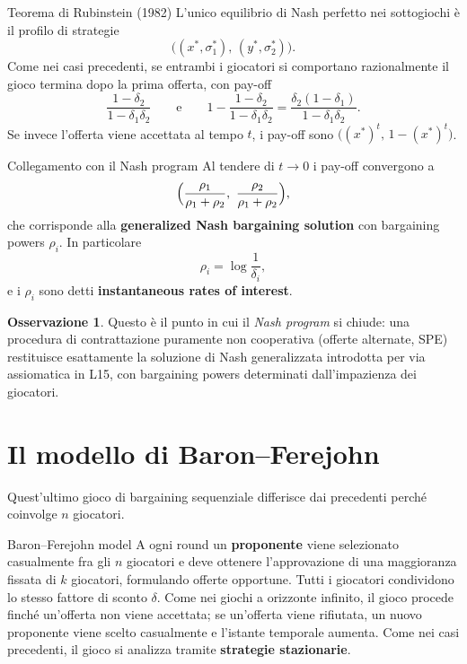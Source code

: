 \documentclass[12pt,a4paper,twoside]{book}
\theoremstyle{plain}
\theoremstyle{definition}
\newtheorem{remark}[theorem]{Osservazione}
\begin{document}
\begin{thmbox}{Teorema di Rubinstein (1982)}
L'unico equilibrio di Nash perfetto nei sottogiochi è il profilo di strategie
\[
  \bigl((x^*,\sigma_1^*),\,(y^*,\sigma_2^*)\bigr).
\]
Come nei casi precedenti, se entrambi i giocatori si comportano razionalmente il gioco
termina dopo la prima offerta, con pay-off
\[
  \frac{1-\delta_2}{1-\delta_1\delta_2}
  \qquad\text{e}\qquad
  1-\frac{1-\delta_2}{1-\delta_1\delta_2}=\frac{\delta_2(1-\delta_1)}{1-\delta_1\delta_2}.
\]
Se invece l'offerta viene accettata al tempo $t$, i pay-off sono
$\bigl((x^*)^t,\,1-(x^*)^t\bigr)$.
\end{thmbox}

\begin{thmbox}{Collegamento con il Nash program}
Al tendere di $t\to0$ i pay-off convergono a
\[
  \Bigl(\frac{\rho_1}{\rho_1+\rho_2},\ \frac{\rho_2}{\rho_1+\rho_2}\Bigr),
\]
che corrisponde alla \textbf{generalized Nash bargaining solution} con bargaining powers
$\rho_i$. In particolare
\[
  \rho_i=\log\frac{1}{\delta_i},
\]
e i $\rho_i$ sono detti \textbf{instantaneous rates of interest}.
\end{thmbox}

\begin{remark}
Questo è il punto in cui il \emph{Nash program} si chiude: una procedura di contrattazione
puramente non cooperativa (offerte alternate, SPE) restituisce esattamente la soluzione di
Nash generalizzata introdotta per via assiomatica in L15, con bargaining powers determinati
dall'impazienza dei giocatori.
\end{remark}

\section{Il modello di Baron--Ferejohn}

Quest'ultimo gioco di bargaining sequenziale differisce dai precedenti perché coinvolge
$n$ giocatori.

\begin{defbox}{Baron--Ferejohn model}
A ogni round un \textbf{proponente} viene selezionato casualmente fra gli $n$ giocatori e deve
ottenere l'approvazione di una maggioranza fissata di $k$ giocatori, formulando offerte
opportune. Tutti i giocatori condividono lo stesso fattore di sconto $\delta$. Come nei giochi
a orizzonte infinito, il gioco procede finché un'offerta non viene accettata; se un'offerta
viene rifiutata, un nuovo proponente viene scelto casualmente e l'istante temporale aumenta.
Come nei casi precedenti, il gioco si analizza tramite \textbf{strategie stazionarie}.
\end{defbox}
\end{document}
